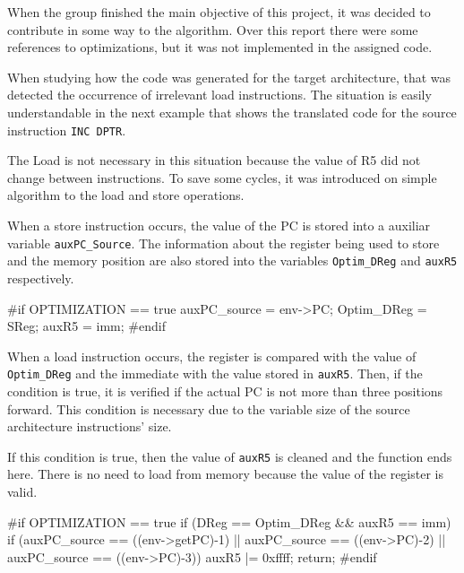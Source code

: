 \documentclass[11pt]{report}
\begin{document}
	\par When the group finished the main objective of this project, it was decided to contribute in some way to the algorithm. Over this report there were some references to optimizations, but it was not implemented in the assigned code. 
	\par When studying how the code was generated for the target architecture, that was detected the occurrence of irrelevant load instructions. The situation is easily understandable in the next example that shows the translated code for the source instruction \texttt{INC DPTR}.
	
	\par The Load is not necessary in this situation because the value of R5 did not change between instructions. To save some cycles, it was introduced on simple algorithm to the load and store operations.
	\par When a store instruction occurs, the value of the PC is stored into a auxiliar variable \texttt{auxPC\_Source}. The information about the register being used to store and the memory position are also stored into the variables \texttt{Optim\_DReg} and \texttt{auxR5} respectively. 
	\begin{Cpp}
	#if OPTIMIZATION == true
		auxPC_source = env->PC;
		Optim_DReg = SReg;
		auxR5 = imm; 
	#endif
	\end{Cpp}
	\par When a load instruction occurs, the register is compared with the value of \texttt{Optim\_DReg} and the immediate with the value stored in \texttt{auxR5}. Then, if the condition is true, it is verified if the actual PC is not more than three positions forward. This condition is necessary due to the variable size of the source architecture instructions' size. 
	\par If this condition is true, then the value of \texttt{auxR5} is cleaned and the function ends here. There is no need to load from memory because the value of the register is valid.
		
	\begin{Cpp}
	#if OPTIMIZATION == true
	if (DReg == Optim_DReg && auxR5 == imm){
		if (auxPC_source == ((env->getPC)-1) || auxPC_source == ((env->PC)-2) || auxPC_source == ((env->PC)-3)){
			auxR5 |= 0xffff;
			return;
		}
	}
	#endif 
	\end{Cpp}
	
\end{document}
